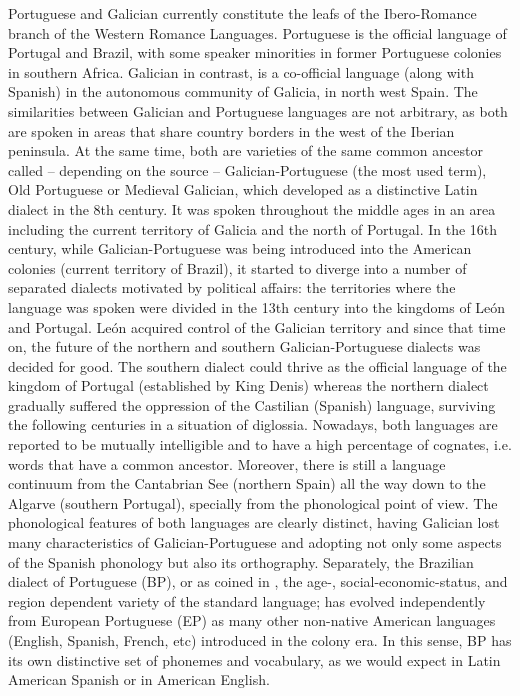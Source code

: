 \documentclass[a4paper,11pt]{article}
\begin{document}
    Portuguese and Galician currently constitute  the leafs of the Ibero-Romance branch of the Western Romance Languages. Portuguese is the official language of Portugal and Brazil, with some  speaker minorities in former Portuguese colonies in southern Africa. Galician in contrast, is a co-official language (along with Spanish) in the autonomous community of Galicia, in north west Spain. The similarities between Galician and Portuguese languages are not arbitrary, as both are spoken in areas that share country borders in the west of the Iberian peninsula. At the same time, both are varieties of the same common ancestor called -- depending on the source -- Galician-Portuguese (the most used term), Old Portuguese or Medieval Galician, which developed as a distinctive Latin dialect in the 8th century. It was spoken throughout the middle ages in an area including the current territory of Galicia and the north of Portugal. In the 16th century, while Galician-Portuguese was being introduced into the American colonies (current territory of Brazil), it started to diverge into a number of separated dialects motivated by political affairs: the territories where the language was spoken were divided in the 13th century into the kingdoms of León and Portugal. León acquired  control of the Galician territory and since that time on, the future of the northern and southern Galician-Portuguese dialects was decided for good. The southern dialect could thrive as the official language of the kingdom of Portugal (established by King Denis) whereas the northern dialect gradually suffered the oppression of the Castilian (Spanish) language, surviving the following centuries in a situation of diglossia. Nowadays, both languages are reported to be mutually intelligible and to have a high percentage of cognates, i.e. words that have a common ancestor. Moreover, there is still a language continuum from the Cantabrian See (northern Spain) all the way down to the Algarve (southern Portugal), specially from the phonological point of view. The phonological features of both languages are clearly distinct, having Galician lost many characteristics of Galician-Portuguese and adopting not only some aspects of the Spanish phonology but also its orthography. Separately, the Brazilian dialect of Portuguese (BP), or as coined in \cite{escudero}, the age-, social-economic-status, and region dependent variety of the standard language; has evolved independently from European Portuguese (EP) as many other non-native American languages  (English, Spanish, French, etc) introduced in the colony era. In this sense, BP has its own distinctive set of phonemes and vocabulary, as we would expect in Latin American Spanish or in American English. \\
    
\end{document}
